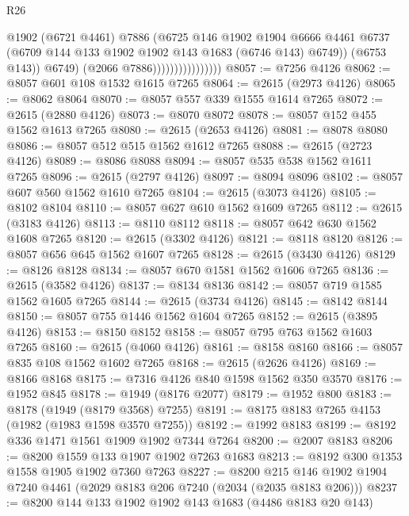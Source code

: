 \begin{lexlean}{R26}
\begin{coremodule}
                                      @1902
                                      (@6721 @4461)
                                      @7886
                                      (@6725
                                        @146
                                        @1902
                                        @1904
                                        @6666
                                        @4461
                                        @6737
                                        (@6709 @144 @133 @1902 @1902 @143 @1683 (@6746 @143) @6749))
                                      (@6753 @143))
                                    @6749)
                                  (@2066 @7886))))))))))))))))
@8057 := @7256 @4126
@8062 := @8057 @601 @108 @1532 @1615 @7265
@8064 := @2615 (@2973 @4126)
@8065 := @8062 @8064
@8070 := @8057 @557 @339 @1555 @1614 @7265
@8072 := @2615 (@2880 @4126)
@8073 := @8070 @8072
@8078 := @8057 @152 @455 @1562 @1613 @7265
@8080 := @2615 (@2653 @4126)
@8081 := @8078 @8080
@8086 := @8057 @512 @515 @1562 @1612 @7265
@8088 := @2615 (@2723 @4126)
@8089 := @8086 @8088
@8094 := @8057 @535 @538 @1562 @1611 @7265
@8096 := @2615 (@2797 @4126)
@8097 := @8094 @8096
@8102 := @8057 @607 @560 @1562 @1610 @7265
@8104 := @2615 (@3073 @4126)
@8105 := @8102 @8104
@8110 := @8057 @627 @610 @1562 @1609 @7265
@8112 := @2615 (@3183 @4126)
@8113 := @8110 @8112
@8118 := @8057 @642 @630 @1562 @1608 @7265
@8120 := @2615 (@3302 @4126)
@8121 := @8118 @8120
@8126 := @8057 @656 @645 @1562 @1607 @7265
@8128 := @2615 (@3430 @4126)
@8129 := @8126 @8128
@8134 := @8057 @670 @1581 @1562 @1606 @7265
@8136 := @2615 (@3582 @4126)
@8137 := @8134 @8136
@8142 := @8057 @719 @1585 @1562 @1605 @7265
@8144 := @2615 (@3734 @4126)
@8145 := @8142 @8144
@8150 := @8057 @755 @1446 @1562 @1604 @7265
@8152 := @2615 (@3895 @4126)
@8153 := @8150 @8152
@8158 := @8057 @795 @763 @1562 @1603 @7265
@8160 := @2615 (@4060 @4126)
@8161 := @8158 @8160
@8166 := @8057 @835 @108 @1562 @1602 @7265
@8168 := @2615 (@2626 @4126)
@8169 := @8166 @8168
@8175 := @7316 @4126 @840 @1598 @1562 @350 @3570
@8176 := @1952 @845
@8178 := @1949 (@8176 @2077)
@8179 := @1952 @800
@8183 := @8178 (@1949 (@8179 @3568) @7255)
@8191 := @8175 @8183 @7265 @4153 (@1982 (@1983 @1598 @3570 @7255))
@8192 := @1992 @8183
@8199 := @8192 @336 @1471 @1561 @1909 @1902 @7344 @7264
@8200 := @2007 @8183
@8206 := @8200 @1559 @133 @1907 @1902 @7263 @1683
@8213 := @8192 @300 @1353 @1558 @1905 @1902 @7360 @7263
@8227 := @8200 @215 @146 @1902 @1904 @7240 @4461 (@2029 @8183 @206 @7240 (@2034 (@2035 @8183 @206)))
@8237 := @8200 @144 @133 @1902 @1902 @143 @1683 (@4486 @8183 @20 @143)

\end{coremodule}
\end{lexlean}
